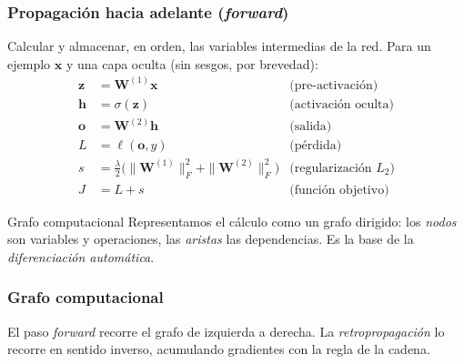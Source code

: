 \documentclass[aspectratio=169, 10pt]{beamer}
\newcommand{\h}{\bm{h}}
\newcommand{\x}{\bm{x}}
\newcommand{\W}{\bm{W}}
\begin{document}
\begin{frame}
\frametitle{Propagaci\'on hacia adelante (\emph{forward})}
Calcular y almacenar, en orden, las variables intermedias de la red. Para un ejemplo $\x$ y una capa oculta (sin sesgos, por brevedad):
\begin{align*}
\bm{z}     &= \W^{(1)}\x                    & \text{(pre-activaci\'on)}\\
\h         &= \sigma(\bm{z})                & \text{(activaci\'on oculta)}\\
\bm{o}     &= \W^{(2)}\h                    & \text{(salida)}\\
L          &= \ell(\bm{o}, y)              & \text{(p\'erdida)}\\
s          &= \tfrac{\lambda}{2}\big(\|\W^{(1)}\|_F^2 + \|\W^{(2)}\|_F^2\big) & \text{(regularizaci\'on $L_2$)}\\
J          &= L + s                        & \text{(funci\'on objetivo)}
\end{align*}
\pause
\begin{block}{Grafo computacional}
Representamos el c\'alculo como un grafo dirigido: los \emph{nodos} son variables y operaciones, las \emph{aristas} las dependencias. Es la base de la \emph{diferenciaci\'on autom\'atica}.
\end{block}
\end{frame}

\begin{frame}
\frametitle{Grafo computacional}
\begin{center}
\end{center}
\vspace{0.4em}
\footnotesize El paso \emph{forward} recorre el grafo de izquierda a derecha. La \emph{retropropagaci\'on} lo recorre en sentido inverso, acumulando gradientes con la regla de la cadena.
\end{frame}
\end{document}
